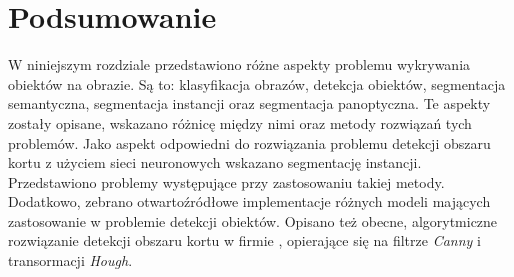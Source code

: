\section{Podsumowanie}
W niniejszym rozdziale przedstawiono różne aspekty problemu wykrywania obiektów na obrazie.
Są to: klasyfikacja obrazów, detekcja obiektów, segmentacja semantyczna, segmentacja instancji oraz segmentacja panoptyczna.
Te aspekty zostały opisane, wskazano różnicę między nimi oraz metody rozwiązań tych problemów.
Jako aspekt odpowiedni do rozwiązania problemu detekcji obszaru kortu z użyciem sieci neuronowych wskazano segmentację instancji.
Przedstawiono problemy występujące przy zastosowaniu takiej metody.
Dodatkowo, zebrano otwartoźródłowe implementacje różnych modeli mających zastosowanie w problemie detekcji obiektów.
Opisano też obecne, algorytmiczne rozwiązanie detekcji obszaru kortu w firmie \blue{}, opierające się na filtrze \textit{Canny} i transormacji \textit{Hough}.
